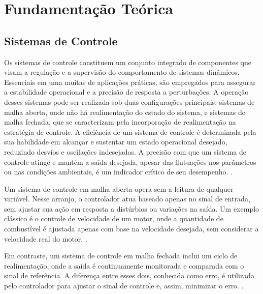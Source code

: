 \chapter{Fundamentação Teórica}


\section{Sistemas de Controle}

Os sistemas de controle constituem um conjunto integrado de componentes que visam a regulação e a supervisão do
comportamento de sistemas dinâmicos.
Essenciais em uma muitas de aplicações práticas, são empregados para assegurar a estabilidade operacional e a precisão
de resposta a perturbações.
A operação desses sistemas pode ser realizada sob duas configurações principais: sistemas de malha aberta,
onde não há realimentação do estado do sistema, e sistemas de malha fechada, que se caracterizam pela incorporação de
realimentação na estratégia de controle.
A eficiência de um sistema de controle é determinada pela sua habilidade em alcançar e sustentar um estado operacional
desejado, reduzindo desvios e oscilações indesejadas.
A precisão com que um sistema de controle atinge e mantém a saída desejada, apesar das flutuações nos parâmetros ou nas
condições ambientais, é um indicador crítico de seu desempenho. \cite{ogata2010engenharia}.

Um sistema de controle em malha aberta opera sem a leitura de qualquer variável.
Nesse arranjo, o controlador atua baseado apenas no sinal de entrada, sem ajustar sua ação em resposta a distúrbios ou
variações na saída.
Um exemplo clássico é o controle de velocidade de um motor, onde a quantidade de combustível é ajustada apenas com base
na velocidade desejada, sem considerar a velocidade real do motor. \cite[Cap 2.3]{ogata2010engenharia}.

Em contraste, um sistema de controle em malha fechada inclui um ciclo de realimentação, onde a saída é continuamente
monitorada e comparada com o sinal de referência.
A diferença entre esses dois, conhecida como erro, é utilizada pelo controlador para ajustar o sinal de controle e,
assim, minimizar o erro. \cite[Cap 2.3]{ogata2010engenharia}.

